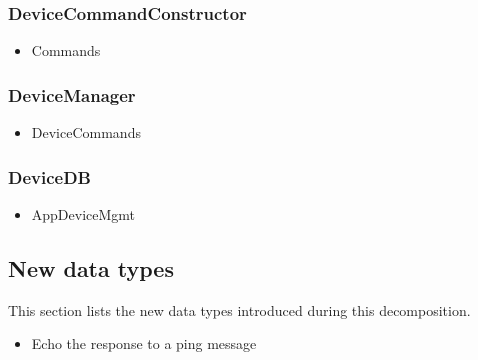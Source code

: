    \subsubsection{DeviceCommandConstructor}
        \begin{itemize}
            \item Commands
        \end{itemize}

    \subsubsection{DeviceManager}
        \begin{itemize}
            \item DeviceCommands
        \end{itemize}

    \subsubsection{DeviceDB}
        \begin{itemize}
            \item AppDeviceMgmt
        \end{itemize}


\subsection{New data types}
    This section lists the new data types introduced during this decomposition.

    \begin{itemize}
        \item Echo the response to a ping message
    \end{itemize}
